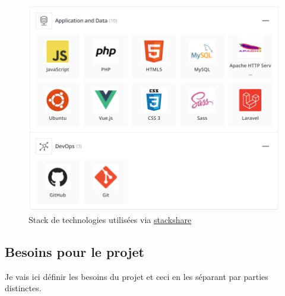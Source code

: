 \documentclass[
    iai, %
    il, %
]{heig-tb}
\begin{document}
\begin{center}
    \begin{figure}
        \includegraphics[width=\textwidth]{./assets/figures/stack-old-tb.png}
        \caption[Stack de technologies]{Stack de technologies utilisées via
            \href{https://stackshare.io/alecberney/bachelors-thesis}{stackshare} \label{stack-old-tb}}
    \end{figure}
\end{center}

\subsection{Besoins pour le projet}
Je vais ici définir les besoins du projet et ceci en les séparant par parties distinctes.
\end{document}
